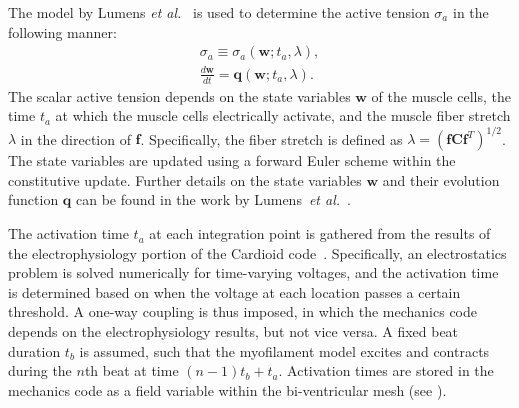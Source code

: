 The model by Lumens \textit{et al.}~\cite{lumens_2009} is used to determine the active tension $\sigma_a$ in the following manner:
\begin{align}
\sigma_a \equiv \sigma_a(\bm{w}; t_a, \lambda), \\
\frac{d\bm{w}}{dt} = \bm{q}(\bm{w}; t_a, \lambda).
\end{align}
The scalar active tension depends on the state variables $\bm{w}$ of the muscle cells, the time $t_a$ at which the muscle cells electrically activate, and the muscle fiber stretch $\lambda$ in the direction of $\bm{f}$. Specifically, the fiber stretch is defined as $\lambda = (\bm{f}\bm{C}\bm{f}^T)^{1/2}$. The state variables are updated using a forward Euler scheme within the constitutive update. Further details on the state variables $\bm{w}$ and their evolution function $\bm{q}$ can be found in the work by Lumens~\textit{et al.}~\cite{lumens_2009}.

The activation time $t_a$ at each integration point is gathered from the results of the electrophysiology portion of the Cardioid code~\cite{richards_2013}. Specifically, an electrostatics problem is solved numerically for time-varying voltages, and the activation time is determined based on when the voltage at each location passes a certain threshold. A one-way coupling is thus imposed, in which the mechanics code depends on the electrophysiology results, but not vice versa. A fixed beat duration $t_b$ is assumed, such that the myofilament model excites and contracts during the $n$th beat at time $(n-1)t_b + t_a$. Activation times are stored in the mechanics code as a field variable within the bi-ventricular mesh (see ).

